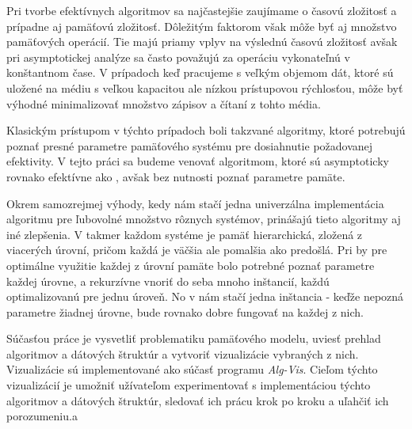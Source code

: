 

Pri tvorbe efektívnych algoritmov sa najčastejšie zaujímame o časovú zložitosť a prípadne aj pamäťovú zložitosť. Dôležitým faktorom však môže byť aj množstvo pamäťových operácií. Tie majú priamy vplyv na výslednú časovú zložitosť avšak pri asymptotickej analýze sa často považujú za operáciu vykonateľnú v konštantnom čase. V prípadoch keď pracujeme s veľkým objemom dát, ktoré sú uložené na médiu s veľkou kapacitou ale nízkou prístupovou rýchlosťou, môže byť výhodné minimalizovať množstvo zápisov a čítaní z tohto média.

Klasickým prístupom v týchto prípadoch boli takzvané \aware algoritmy, ktoré potrebujú poznať presné parametre pamäťového systému pre dosiahnutie požadovanej efektivity. V tejto práci sa budeme venovať \obliv algoritmom, ktoré sú asymptoticky rovnako efektívne ako \aware, avšak bez nutnosti poznať parametre pamäte.

Okrem samozrejmej výhody, kedy nám stačí jedna univerzálna implementácia algoritmu pre ľubovolné množstvo rôznych systémov, prinášajú tieto algoritmy aj iné zlepšenia. V takmer každom systéme je pamäť hierarchická, zložená z viacerých úrovní, pričom každá je väčšia ale pomalšia ako predošlá. Pri \aware by pre optimálne využitie každej z úrovní pamäte bolo potrebné poznať parametre každej úrovne, a rekurzívne vnoriť do seba mnoho inštancií, každú optimalizovanú pre jednu úroveň. No v \obliv nám stačí jedna inštancia - keďže nepozná parametre žiadnej úrovne, bude rovnako dobre fungovať na každej z nich.

Súčasťou práce je vysvetliť problematiku \obliv pamäťového modelu, uviesť prehlad algoritmov a dátových štruktúr a vytvoriť vizualizácie vybraných z nich. Vizualizácie sú implementované ako súčasť programu {\em Alg-Vis}. Cieľom týchto vizualizácií je umožniť užívateľom experimentovať s implementáciou týchto algoritmov a dátových štruktúr, sledovať ich prácu krok po kroku a uľahčiť ich porozumeniu.a